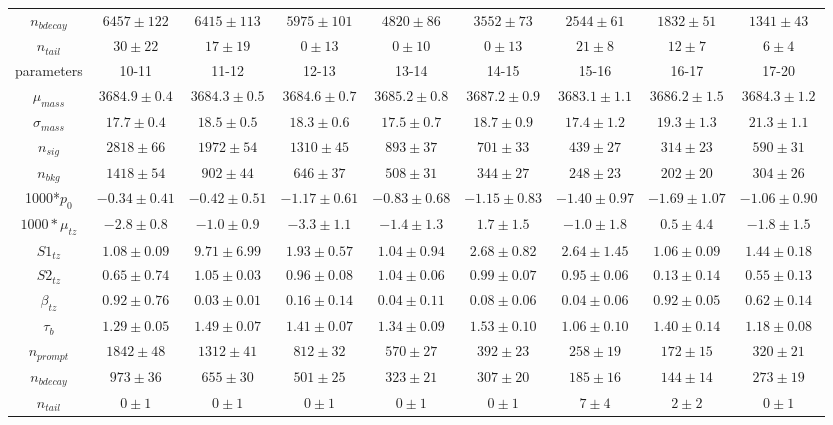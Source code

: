 \begin{sidewaystable}[h]
\begin{center}
{\begin{tabular}{c|cccccccc}
$n_{bdecay}$  & $6457\pm122$ & $6415\pm113$ & $5975\pm101$ & $4820\pm86$ & $3552\pm73$ & $2544\pm61$ & $1832\pm51$ & $1341\pm43$\\
$n_{tail}$  & $30\pm22$ & $17\pm19$ & $0\pm13$ & $0\pm10$ & $0\pm13$ & $21\pm8$ & $12\pm7$ & $6\pm4$\\
\hline
parameters  & 10-11& 11-12 & 12-13 & 13-14  &  14-15 & 15-16 & 16-17 & 17-20 \\ \hline
$\mu_{mass}$  & $3684.9\pm0.4$ & $3684.3\pm0.5$ & $3684.6\pm0.7$ & $3685.2\pm0.8$ & $3687.2\pm0.9$ & $3683.1\pm1.1$ & $3686.2\pm1.5$ & $3684.3\pm1.2$\\
$\sigma_{mass}$  & $17.7\pm0.4$ & $18.5\pm0.5$ & $18.3\pm0.6$ & $17.5\pm0.7$ & $18.7\pm0.9$ & $17.4\pm1.2$ & $19.3\pm1.3$ & $21.3\pm1.1$\\
$n_{sig}$  & $2818\pm66$ & $1972\pm54$ & $1310\pm45$ & $893\pm37$ & $701\pm33$ & $439\pm27$ & $314\pm23$ & $590\pm31$\\
$n_{bkg}$  & $1418\pm54$ & $902\pm44$ & $646\pm37$ & $508\pm31$ & $344\pm27$ & $248\pm23$ & $202\pm20$ & $304\pm26$\\
1000*$p_{0}$  & $-0.34\pm0.41$ & $-0.42\pm0.51$ & $-1.17\pm0.61$ & $-0.83\pm0.68$ & $-1.15\pm0.83$ & $-1.40\pm0.97$ & $-1.69\pm1.07$ & $-1.06\pm0.90$\\
$1000*\mu_{tz}$  & $-2.8\pm0.8$ & $-1.0\pm0.9$ & $-3.3\pm1.1$ & $-1.4\pm1.3$ & $1.7\pm1.5$ & $-1.0\pm1.8$ & $0.5\pm4.4$ & $-1.8\pm1.5$\\
$S1_{tz}$  & $1.08\pm0.09$ & $9.71\pm6.99$ & $1.93\pm0.57$ & $1.04\pm0.94$ & $2.68\pm0.82$ & $2.64\pm1.45$ & $1.06\pm0.09$ & $1.44\pm0.18$\\
$S2_{tz}$  & $0.65\pm0.74$ & $1.05\pm0.03$ & $0.96\pm0.08$ & $1.04\pm0.06$ & $0.99\pm0.07$ & $0.95\pm0.06$ & $0.13\pm0.14$ & $0.55\pm0.13$\\
$\beta_{tz}$  & $0.92\pm0.76$ & $0.03\pm0.01$ & $0.16\pm0.14$ & $0.04\pm0.11$ & $0.08\pm0.06$ & $0.04\pm0.06$ & $0.92\pm0.05$ & $0.62\pm0.14$\\
$\tau_{b}$  & $1.29\pm0.05$ & $1.49\pm0.07$ & $1.41\pm0.07$ & $1.34\pm0.09$ & $1.53\pm0.10$ & $1.06\pm0.10$ & $1.40\pm0.14$ & $1.18\pm0.08$\\
$n_{prompt}$  & $1842\pm48$ & $1312\pm41$ & $812\pm32$ & $570\pm27$ & $392\pm23$ & $258\pm19$ & $172\pm15$ & $320\pm21$\\
$n_{bdecay}$  & $973\pm36$ & $655\pm30$ & $501\pm25$ & $323\pm21$ & $307\pm20$ & $185\pm16$ & $144\pm14$ & $273\pm19$\\
$n_{tail}$  & $0\pm1$ & $0\pm1$ & $0\pm1$ & $0\pm1$ & $0\pm1$ & $7\pm4$ & $2\pm2$ & $0\pm1$\\
\hline
\end{tabular}
}
\end{center} 
\end{sidewaystable}  



